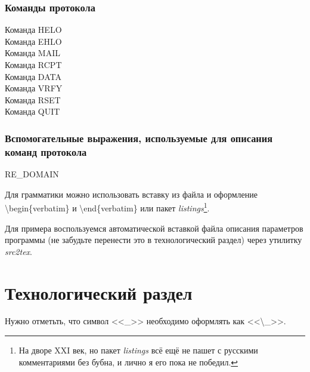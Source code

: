 \documentclass[a4paper,12pt]{report}
\begin{document}
\subsection{Команды протокола}
\begin{description}
\item[Команда HELO]

\item[Команда EHLO]

\item[Команда MAIL]

\item[Команда RCPT]

\item[Команда DATA]

\item[Команда VRFY]

\item[Команда RSET]

\item[Команда QUIT]

\end{description}

\subsection{Вспомогательные выражения, используемые для описания команд протокола}
\begin{description}
\item[RE\_DOMAIN]

\end{description}


Для грамматики можно использовать вставку из файла и оформление \textbackslash{}begin\{verbatim\} и \textbackslash{}end\{verbatim\} или пакет \textit{listings}\footnote{На дворе XXI век, но пакет \textit{listings} всё ещё не пашет с русскими комментариями без бубна, и лично я его пока не победил.}.

Для примера воспользуемся автоматической вставкой файла описания параметров программы (не забудьте перенести это в технологический раздел) через утилитку \textit{src2tex}.


% 

\chapter{Технологический раздел}

Нужно отметьть, что символ <<\_>> необходимо оформлять как <<\textbackslash\_>>.
\end{document}
